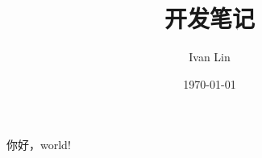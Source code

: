 \documentclass[UTF8]{ctexart}
\title{开发笔记}
\author{Ivan Lin}
\date{\today}
\begin{document}
\maketitle
你好，world!
\end{document}
